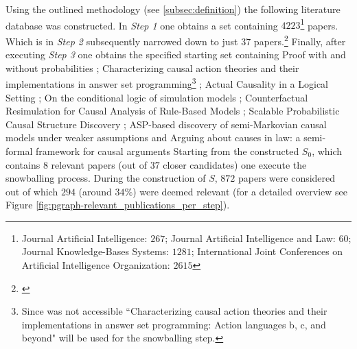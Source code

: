 \documentclass[11pt,a4paper]{book}
\theoremstyle{definition}
\theoremstyle{definition}
\theoremstyle{definition}
\theoremstyle{remark}
\newcommand{\pset}{S}
\newcommand{\psetz}{S_{\mathit{0}}}
\begin{document}
Using the outlined methodology (see \ref{subsec:definition}) the following literature database was constructed. 
In \emph{Step 1} one obtains a set containing $4223$\footnote{Journal Artificial Intelligence: $267$; Journal Artificial Intelligence and Law:  $60$; Journal Knowledge-Bases Systems: $1281$; International Joint Conferences on Artificial Intelligence Organization: $2615$} papers. Which is in \emph{Step 2} subsequently narrowed down to just $37$ papers.\footnote{\parencite{van2019separators,verheij2017proof,chen2019judicial,neil2019modelling,li2019context,lu2018mining,zhang2018collective,
constantinou2017towards,liang2017evaluation,zhang2017characterizing,mu2018measuring,kronegger2019backdoors,hyttinen2017core,
zhang2017transfer,zhang2017causal,liu2017cause,summerville2017charda,zhang2016causal,albrecht2016exploiting,chai2018language,
bochman2018actual,ibeling2018conditional,laurent2018counterfactual,chikahara2018causal,zhang2017achieving,backstrom2018novel,
jaber2018graphical,sridhar2018scalable,wenjuan2018mixed,xu2019achieving,zhang2019asp,Cai2019CausalDW,Sridhar2019EstimatingCE,
xie2019boosting,hassanzadeh2019answering,shankar2019three,Liepina2019ArguingAC}}
Finally, after executing \emph{Step 3} one obtains the specified starting set containing Proof with and without probabilities \parencite{verheij2017proof}; Characterizing causal action theories and their implementations in answer set programming\footnote{Since \parencite{zhang2017characterizing} was not accessible ``Characterizing causal action theories and their implementations in answer set programming: Action languages b, c, and beyond" \parencite{zhang2015characterizing} will be used for the snowballing step.} \parencite{zhang2017characterizing}; Actual Causality in a Logical Setting \parencite{bochman2018actual}; On the conditional logic of simulation models \parencite{ibeling2018conditional}; Counterfactual Resimulation for Causal Analysis of Rule-Based Models \parencite{laurent2018counterfactual};  Scalable Probabilistic Causal Structure Discovery \parencite{sridhar2018scalable}; ASP-based discovery of semi-Markovian causal models under weaker assumptions \parencite{zhang2019asp} and Arguing about causes in law: a semi-formal framework for causal arguments \parencite{Liepina2019ArguingAC}
Starting from the constructed $\psetz$, which contains $8$ relevant papers (out of $37$ closer candidates) one execute the snowballing process. During the construction of $\pset$, $872$ papers were considered out of which $294$ (around $34 \%$) were deemed relevant (for a detailed overview see Figure \ref{fig:pgraph-relevant_publications_per_step}).
\end{document}
